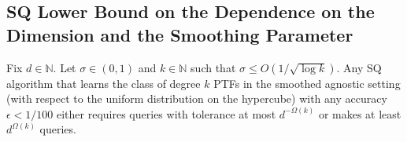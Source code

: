 \documentclass{theoretics}
\newcommand{\1}{\Ind}
\begin{document}
\subsection{SQ Lower Bound on the Dependence on the Dimension and the Smoothing Parameter}


\begin{theorem}\label{thm:sq-noise-variance} 
Fix $d \in \mathbb N$. 
Let $\sigma \in (0, 1)$ and $k \in \mathbb N$ such that  $ \sigma\leq  O(1/\sqrt{\log k})$.
Any SQ algorithm that learns the class of degree $k$ PTFs
in the smoothed agnostic setting (with respect to the uniform distribution on the hypercube) with any accuracy $\epsilon < 1/100$
either requires queries with tolerance at
most $d^{-\Omega(k)}$ or makes at least $d^{\Omega(k)}$ queries.
\end{theorem}
\end{document}
